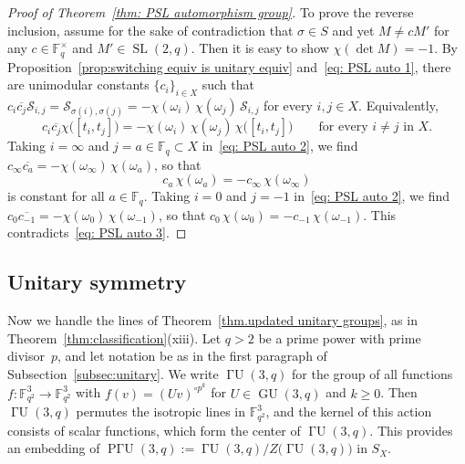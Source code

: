 \begin{proof}[Proof of Theorem~\ref{thm: PSL automorphism group}]
To prove the reverse inclusion, assume for the sake of contradiction that $\sigma \in S$ and yet $M \neq c M'$ for any $c \in \mathbb{F}_q^\times$ and $M' \in \operatorname{SL}(2,q)$.
Then it is easy to show $\chi( \det M ) = -1$.
By Proposition~\ref{prop:switching equiv is unitary equiv} and~\eqref{eq: PSL auto 1}, there are unimodular constants $\{ c_i \}_{i\in X}$ such that
$c_i \overline{c_j} \mathcal{S}_{i,j} 
= \mathcal{S}_{\sigma(i), \sigma(j)}
= - \chi(\omega_i) \, \chi(\omega_j) \, \mathcal{S}_{i,j}$
for every $i,j \in X$.
Equivalently,
\begin{equation}
\label{eq: PSL auto 2}
c_i \overline{c_j} \chi\bigl( [t_i, t_j] \bigr)
= - \chi( \omega_i) \, \chi( \omega_j ) \, \chi\bigl( [t_i, t_j] \bigr)
\qquad
\text{for every $i \neq j$ in $X$}.
\end{equation}
Taking $i = \infty$ and $j = a\in \mathbb{F}_q \subset X$ in~\eqref{eq: PSL auto 2}, we find $c_\infty \overline{c_a} = - \chi( \omega_\infty)\, \chi( \omega_a )$, so that
\begin{equation}
\label{eq: PSL auto 3}
c_a\,  \chi( \omega_a) 
= -  c_\infty \, \chi( \omega_\infty)
\end{equation}
is constant for all $a \in \mathbb{F}_q$.
Taking $i = 0$ and $j = -1$ in~\eqref{eq: PSL auto 2}, we find $c_0 \overline{c_{-1}} = - \chi( \omega_0) \, \chi( \omega_{-1} )$, so that $c_0 \, \chi( \omega_0 )  = -  c_{-1} \, \chi( \omega_{-1} )$.
This contradicts~\eqref{eq: PSL auto 3}.
\end{proof}



\subsection{Unitary symmetry}

Now we handle the lines of Theorem~\ref{thm.updated unitary groups}, as in Theorem~\ref{thm:classification}(xiii).
Let $q>2$ be a prime power with prime divisor~$p$, and let notation be as in the first paragraph of Subsection~\ref{subsec:unitary}.
We write $\operatorname{\text{$\Gamma$}U}(3,q)$ for the group of all functions $f \colon \mathbb{F}_{q^2}^3 \to \mathbb{F}_{q^2}^3$ with $f(v) = (Uv)^{\circ p^k}$ for $U \in \operatorname{GU}(3,q)$ and $k \geq 0$.
Then $\operatorname{\text{$\Gamma$}U}(3,q)$ permutes the isotropic lines in $\mathbb{F}_{q^2}^3$, and the kernel of this action consists of scalar functions, which form the center of $\operatorname{\text{$\Gamma$}U}(3,q)$.
This provides an embedding of $\operatorname{P\text{$\Gamma$}U}(3,q) := \operatorname{\text{$\Gamma$}U}(3,q) / Z\bigl( \operatorname{\text{$\Gamma$}U}(3,q) \bigr)$ in $S_X$.

